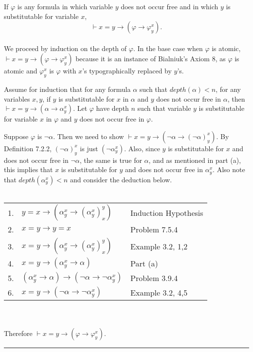 \documentclass[11pt]{hmcpset}
\newenvironment{problem2}[1]{\noindent {\bf (#1}}
{\medskip}
\newenvironment{proof}{\noindent {\bf Proof:} \\}{\hfill
\rule{1mm}{3mm} \bigskip}
\begin{document}
\begin{problem2}{b)} If $\varphi$ is any formula in which variable $y$ does not occur free and in which $y$ is substitutable for variable $x$, $$\vdash x=y\to(\varphi\to\varphi_y^x).$$
\begin{proof}\indent We proceed by induction on the depth of $\varphi$. In the base case when $\varphi$ is atomic, $\vdash x=y\to(\varphi\to\varphi_y^x)$ because it is an instance of Bialniuk's Axiom 8, as $\varphi$ is atomic and $\varphi_y^x$ is $\varphi$ with $x$'s typographically replaced by $y$'s.

Assume for induction that for any formula $\alpha$ such that $depth(\alpha)<n$, for any variables $x,y$, if $y$ is substitutable for $x$ in $\alpha$ and $y$ does not occur free in $\alpha$, then $\vdash x=y\to(\alpha\to\alpha_y^x)$. Let $\varphi$ have depth $n$ such that variable $y$ is substitutable for variable $x$ in $\varphi$ and $y$ does not occur free in $\varphi$.

Suppose $\varphi$ is $\neg\alpha$. Then we need to show $\vdash x=y\to(\neg\alpha\to(\neg\alpha)_y^x)$. By Definition 7.2.2, $(\neg\alpha)_y^x$ is just $(\neg\alpha_y^x)$. Also, since $y$ is substitutable for $x$ and does not occur free in $\neg\alpha$, the same is true for $\alpha$, and as mentioned in part (a), this implies that $x$ is substitutable for $y$ and does not occur free in $\alpha_y^x$. Also note that $depth(\alpha_y^x)<n$ and consider the deduction below.\\\\
\begin{tabular}{rll}
1. & $y=x\to(\alpha_y^x\to(\alpha_y^x)_x^y)$ & Induction Hypothesis\\
2. & $x=y\to y=x$  & Problem 7.5.4\\
3. & $x=y\to(\alpha_y^x\to(\alpha_y^x)_x^y)$   &  Example 3.2, 1,2\\
4. & $x=y\to(\alpha_y^x\to\alpha)$  &  Part (a)\\
5. & $(\alpha_y^x\to\alpha)\to(\neg\alpha\to\neg\alpha_y^x)$   &    Problem 3.9.4\\
6. & $x=y\to(\neg\alpha\to\neg\alpha_y^x)$   &   Example 3.2, 4,5\end{tabular}\\\\
Therefore $\vdash x=y\to(\varphi\to\varphi_y^x)$.


\end{proof}
\end{problem2}
\end{document}
